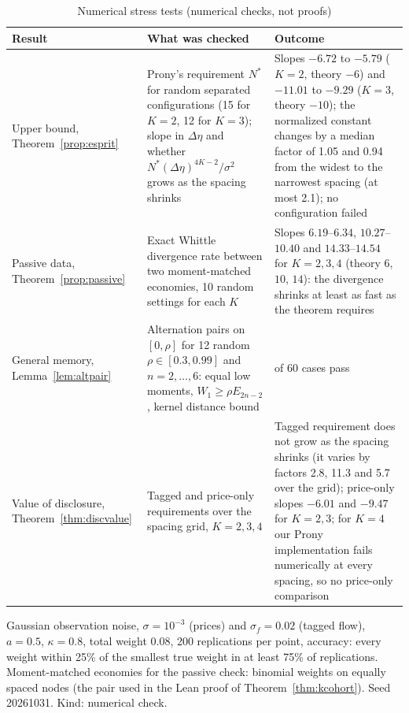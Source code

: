 \begin{table}[!htbp]\centering\footnotesize
\begin{threeparttable}
\caption{Numerical stress tests (numerical checks, not proofs)}\label{tab:stress}
\setlength{\tabcolsep}{3pt}
\begin{tabular}{>{\raggedright\arraybackslash}p{}>{\raggedright\arraybackslash}p{}>{\raggedright\arraybackslash}p{}}
\toprule
Result & What was checked & Outcome\\
\midrule
Upper bound, Theorem~\ref{prop:esprit} & Prony's requirement $N^*$ for random separated configurations (15 for $K=2$, 12 for $K=3$); slope in $\Delta\eta$ and whether $N^*(\Delta\eta)^{4K-2}/\sigma^2$ grows as the spacing shrinks & Slopes $-6.72$ to $-5.79$ ($K=2$, theory $-6$) and $-11.01$ to $-9.29$ ($K=3$, theory $-10$); the normalized constant changes by a median factor of 1.05 and 0.94 from the widest to the narrowest spacing (at most 2.1); no configuration failed\\
Passive data, Theorem~\ref{prop:passive} & Exact Whittle divergence rate between two moment-matched economies, 10 random settings for each $K$ & Slopes $6.19$--$6.34$, $10.27$--$10.40$ and $14.33$--$14.54$ for $K=2,3,4$ (theory $6$, $10$, $14$): the divergence shrinks at least as fast as the theorem requires\\
General memory, Lemma~\ref{lem:altpair} & Alternation pairs on $[0,\rho]$ for 12 random $\rho\in[0.3,0.99]$ and $n=2,\ldots,6$: equal low moments, $W_1\ge\rho E_{2n-2}$, kernel distance bound & 60 of 60 cases pass\\
Value of disclosure, Theorem~\ref{thm:discvalue} & Tagged and price-only requirements over the spacing grid, $K=2,3,4$ & Tagged requirement does not grow as the spacing shrinks (it varies by factors 2.8, 11.3 and 5.7 over the grid); price-only slopes $-6.01$ and $-9.47$ for $K=2,3$; for $K=4$ our Prony implementation fails numerically at every spacing, so no price-only comparison\\
\bottomrule
\end{tabular}
\begin{tablenotes}\footnotesize\item Gaussian observation noise, $\sigma=10^{-3}$ (prices) and $\sigma_f=0.02$ (tagged flow), $a=0.5$, $\kappa=0.8$, total weight $0.08$, 200 replications per point, accuracy: every weight within 25\% of the smallest true weight in at least 75\% of replications. Moment-matched economies for the passive check: binomial weights on equally spaced nodes (the pair used in the Lean proof of Theorem~\ref{thm:kcohort}). Seed 20261031. Kind: numerical check.\end{tablenotes}
\end{threeparttable}
\end{table}


